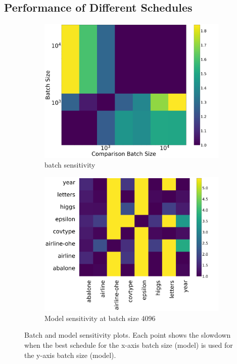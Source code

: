 \subsection{Performance of Different Schedules} 
\begin{figure}[htb]
  \begin{subfigure}[t]{.45\linewidth}
    \vspace{0pt}
    \centering
    \includegraphics[width=\linewidth]{figures/batch_sensitivity_covtype.png}
    \vspace{2pt}
    \caption{\label{fig:sensitivitya} batch sensitivity}
  \end{subfigure}\hfill
  \begin{subfigure}[t]{.52\linewidth}
    \vspace{0pt}
    \centering
    \includegraphics[width=\linewidth]{figures/model_sensitivity_4096.png}
    \caption{\label{fig:sensitivityb}Model sensitivity at batch size 4096}
  \end{subfigure}
  \caption{Batch and model sensitivity plots. Each point shows the slowdown when the best schedule for the x-axis batch size (model) is used for the y-axis batch size (model).}
\end{figure}

